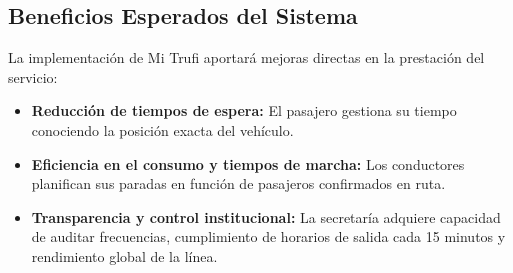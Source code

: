 \subsection{Beneficios Esperados del Sistema}

La implementación de Mi Trufi aportará mejoras directas en la prestación del servicio:

\begin{itemize}
    \item \textbf{Reducción de tiempos de espera:} El pasajero gestiona su tiempo conociendo la posición exacta del vehículo.
    \item \textbf{Eficiencia en el consumo y tiempos de marcha:} Los conductores planifican sus paradas en función de pasajeros confirmados en ruta.
    \item \textbf{Transparencia y control institucional:} La secretaría adquiere capacidad de auditar frecuencias, cumplimiento de horarios de salida cada 15 minutos y rendimiento global de la línea.
\end{itemize}
